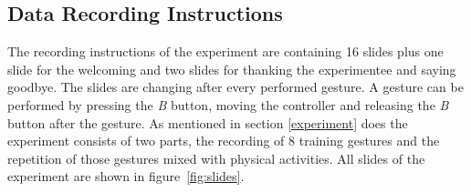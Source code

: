 \subsection{Data Recording Instructions} \label{data_recording_instructions}
The recording instructions of the experiment are containing 16 slides plus one slide for the welcoming and two slides
for thanking the experimentee and saying goodbye. The slides are changing after every performed gesture. A gesture can
be performed by pressing the \textit{B} button, moving the controller and releasing the \textit{B} button after the
gesture. As mentioned in section \ref{experiment} does the experiment consists of two parts, the recording of 8 training
gestures and the repetition of those gestures mixed with physical activities. All slides of the experiment are shown in
figure~\ref{fig:slides}.

